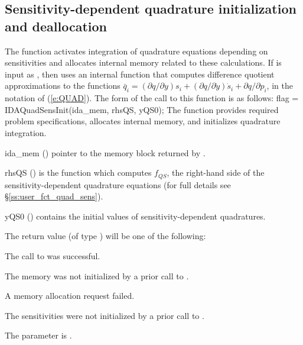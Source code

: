 
\subsection{Sensitivity-dependent quadrature initialization and deallocation}
\label{ss:quad_sens_init}

The function  activates integration of quadrature equations depending
on sensitivities and allocates internal memory related to these calculations.
If  is input as , then {\idas} uses an internal function that
computes difference quotient approximations to the functions
$\bar q_i = (\partial q / \partial y) s_i + (\partial q / \partial \dot{y}) \dot{s}_i +
 \partial q / \partial p_i$, in the notation of (\ref{e:QUAD}).
The form of the call to this function is as follows:
{
flag = IDAQuadSensInit(ida\_mem, rhsQS, yQS0);
}
{
  The function  provides required problem specifications,
  allocates internal memory, and initializes quadrature integration.
}
{
  \begin{args}
  \item[ida\_mem] ()
    pointer to the {\idas} memory block returned by .
  \item[rhsQS] ()
    is the {\CC} function which computes $f_{QS}$, the right-hand side of the 
    sensitivity-dependent quadrature equations
    (for full details see \S\ref{ss:user_fct_quad_sens}).
  \item[yQS0] ()
    contains the initial values of sensitivity-dependent quadratures.
  \end{args}
}
{
  The return value  (of type ) will be one of the following:
  \begin{args}
  \item[\Id{IDA\_SUCCESS}]
    The call to  was successful.
  \item[\Id{IDA\_MEM\_NULL}] 
    The {\idas} memory was not initialized by a prior call to .
  \item[\Id{IDA\_MEM\_FAIL}] 
    A memory allocation request failed.
  \item[\Id{IDA\_NO\_SENS}] 
    The sensitivities were not initialized by a prior call to .
  \item[\Id{IDA\_ILL\_INPUT}]
    The parameter  is .
  \end{args}
}
